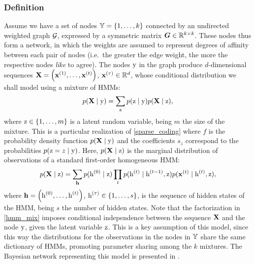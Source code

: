 \subsubsection{Definition}
\label{sec:spamhmm_definition}
Assume we have a set of nodes ${\mathbb{Y}}=\{1, \dots, k\}$ connected by an undirected weighted graph ${\mathcal{G}}$, expressed by a symmetric matrix ${\bm{G}} \in \mathbb{R}^{k \times k}$. These nodes thus form a network, in which the weights are assumed to represent degrees of affinity between each pair of nodes (i.e.\ the greater the edge weight, the more the respective nodes \textit{like} to agree). The nodes ${\textnormal{y}}$ in the graph produce $d$-dimensional sequences ${\mathbf{X}} = \left({\mathbf{x}}^{(1)}, \dots,{\mathbf{x}}^{(t)} \right)$, ${\mathbf{x}}^{(\tau)} \in \mathbb{R}^d$, whose conditional distribution we shall model using a mixture of HMMs:
\begin{equation}
\label{hmm_mix}
p({\mathbf{X}} \mid {\textnormal{y}}) = \sum_{{\textnormal{z}}} p({\textnormal{z}}\mid{\textnormal{y}}) p({\mathbf{X}} \mid {\textnormal{z}}),
\end{equation}
where ${\textnormal{z}} \in \{1, \dots, m\}$ is a latent random variable, being $m$ the size of the mixture. This is a particular realization of \eqref{sparse_coding} where $f$ is the probability density function $p({\mathbf{X}} \mid {\textnormal{y}})$ and the coefficients $s_z$ correspond to the probabilities $p({\textnormal{z}} = z \mid {\textnormal{y}})$. Here, $p({\mathbf{X}} \mid {\textnormal{z}})$ is the marginal distribution of observations of a standard first-order homogeneous HMM:
\begin{equation}
\label{hmm}
p({\mathbf{X}} \mid {\textnormal{z}}) = \sum_{{\mathbf{h}}} p({\textnormal{h}}^{(0)}\mid{\textnormal{z}}) \prod_t p({\textnormal{h}}^{(t)}\mid{\textnormal{h}}^{(t-1)},{\textnormal{z}}) p({\mathbf{x}}^{(t)}\mid{\textnormal{h}}^{(t)},{\textnormal{z}}),
\end{equation}
where ${\mathbf{h}} = \left({\textnormal{h}}^{(0)}, \dots,{\textnormal{h}}^{(t)} \right)$, ${\textnormal{h}}^{(\tau)} \in \{1, \dots, s\}$, is the sequence of hidden states of the HMM, being $s$ the number of hidden states. Note that the factorization in \eqref{hmm_mix} imposes conditional independence between the sequence ${\mathbf{X}}$ and the node ${\textnormal{y}}$, given the latent variable ${\textnormal{z}}$. This is a key assumption of this model, since this way the distributions for the observations in the nodes in ${\mathbb{Y}}$ share the same dictionary of HMMs, promoting parameter sharing among the $k$ mixtures. The Bayesian network representing this model is presented in .

